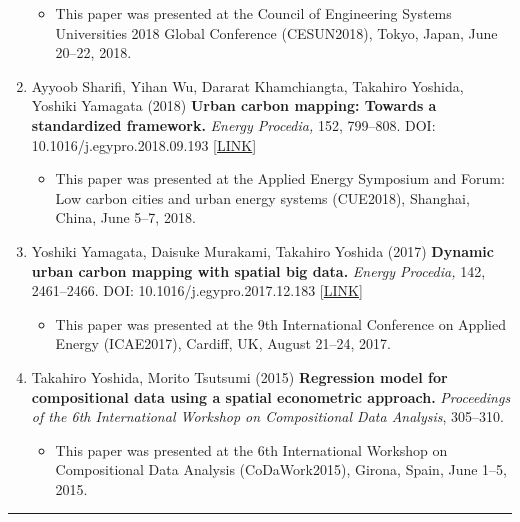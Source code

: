\documentclass[]{book}
\providecommand{\tightlist}{%
  \setlength{\itemsep}{0pt}\setlength{\parskip}{0pt}}
\begin{document}
\begin{enumerate}
  \begin{itemize}
  \tightlist
  \item
    This paper was presented at the Council of Engineering Systems Universities 2018 Global Conference (CESUN2018), Tokyo, Japan, June 20--22, 2018.
  \end{itemize}
\item
  Ayyoob Sharifi, Yihan Wu, Dararat Khamchiangta, Takahiro Yoshida, Yoshiki Yamagata (2018)
  \textbf{Urban carbon mapping: Towards a standardized framework.}
  \emph{Energy Procedia,} 152, 799--808.
  DOI: 10.1016/j.egypro.2018.09.193 {[}\href{https://www.sciencedirect.com/science/article/pii/S1876610218307379}{LINK}{]}

  \begin{itemize}
  \tightlist
  \item
    This paper was presented at the Applied Energy Symposium and Forum: Low carbon cities and urban energy systems (CUE2018), Shanghai, China, June 5--7, 2018.
  \end{itemize}
\item
  Yoshiki Yamagata, Daisuke Murakami, Takahiro Yoshida (2017)
  \textbf{Dynamic urban carbon mapping with spatial big data.}
  \emph{Energy Procedia,} 142, 2461--2466.
  DOI: 10.1016/j.egypro.2017.12.183 {[}\href{https://www.sciencedirect.com/science/article/pii/S1876610217359131}{LINK}{]}

  \begin{itemize}
  \tightlist
  \item
    This paper was presented at the 9th International Conference on Applied Energy (ICAE2017), Cardiff, UK, August 21--24, 2017.
  \end{itemize}
\item
  Takahiro Yoshida, Morito Tsutsumi (2015)
  \textbf{Regression model for compositional data using a spatial econometric approach.}
  \emph{Proceedings of the 6th International Workshop on Compositional Data Analysis}, 305--310.

  \begin{itemize}
  \tightlist
  \item
    This paper was presented at the 6th International Workshop on Compositional Data Analysis (CoDaWork2015), Girona, Spain, June 1--5, 2015.
  \end{itemize}
\end{enumerate}

\begin{center}\rule{0.5\linewidth}{0.5pt}\end{center}
\end{document}
